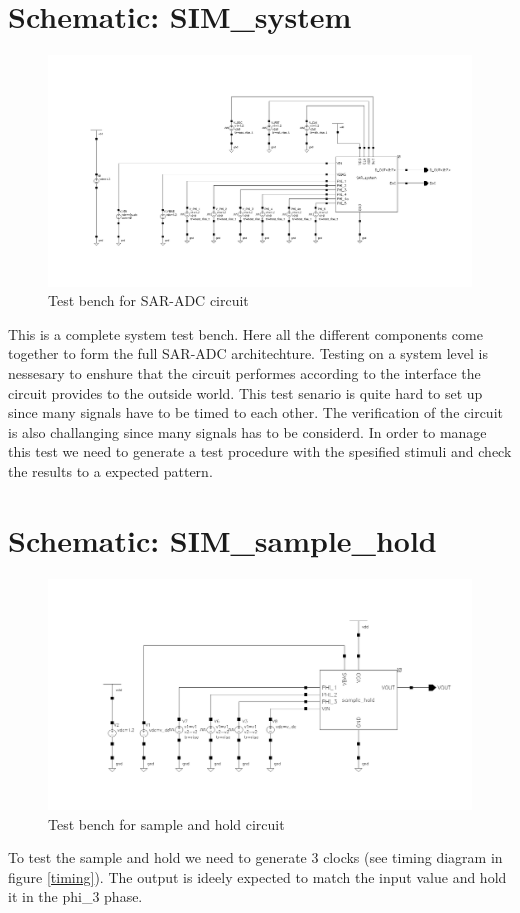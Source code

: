\documentclass[english, a4paper,11pt]{article}
\begin{document}
\section*{Schematic: SIM\_system}
\begin{figure}[!ht]
 \centering
   \includegraphics[width=\textwidth]{img/SIM_system.png}
   \caption{Test bench for SAR-ADC circuit}
   \label{sim:system}
\end{figure}
This is a complete system test bench. Here all the different components come together to form the full SAR-ADC architechture. 
Testing on a system level is nessesary to enshure that the circuit performes according to the interface the circuit provides to the outside world.
This test senario is quite hard to set up since many signals have to be timed to each other. The verification of the circuit is also challanging since many signals has to be considerd.
In order to manage this test we need to generate a test procedure with the spesified stimuli and check the results to a expected pattern.

\section*{Schematic: SIM\_sample\_hold}
\begin{figure}[!ht]
 \centering
   \includegraphics[width=\textwidth]{img/SIM_sample_hold.png}
   \caption{Test bench for sample and hold circuit}
   \label{sim:sh}
\end{figure}
To test the sample and hold we need to generate 3 clocks (see timing diagram in figure \ref{timing}). 
The output is ideely expected to match the input value and hold it in the phi\_3 phase.
\end{document}
